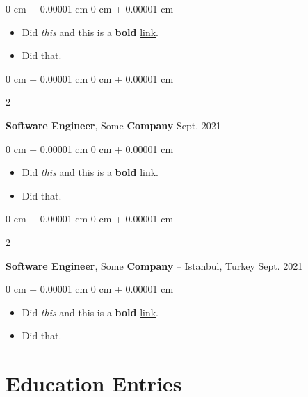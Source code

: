 \documentclass[10pt, letterpaper]{article}
\newenvironment{highlights}{
    \begin{itemize}[
        topsep=0.10 cm,
        parsep=0.10 cm,
        partopsep=0pt,
        itemsep=0pt,
        leftmargin=0 cm + 10pt
    ]
}{
    \end{itemize}
} %
\newenvironment{onecolentry}{
    \begin{adjustwidth}{
        0 cm + 0.00001 cm
    }{
        0 cm + 0.00001 cm
    }
}{
    \end{adjustwidth}
} %
\newenvironment{twocolentry}[2][]{
    \onecolentry
    \def\secondColumn{#2}
    \setcolumnwidth{\fill, 4.5 cm}
    \begin{paracol}{2}
}{
    \switchcolumn \raggedleft \secondColumn
    \end{paracol}
    \endonecolentry
} %
\begin{document}
        \vspace{0.10 cm}
        \begin{onecolentry}
            \begin{highlights}
                \item Did \textit{this} and this is a \textbf{bold} \href{https://example.com}{link}.
                \item Did that.
            \end{highlights}
        \end{onecolentry}


        \vspace{0.2 cm}

        \begin{twocolentry}{
            Sept. 2021
        }
            \textbf{Software Engineer}, Some \textbf{Company}\end{twocolentry}

        \vspace{0.10 cm}
        \begin{onecolentry}
            \begin{highlights}
                \item Did \textit{this} and this is a \textbf{bold} \href{https://example.com}{link}.
                \item Did that.
            \end{highlights}
        \end{onecolentry}


        \vspace{0.2 cm}

        \begin{twocolentry}{
            Sept. 2021
        }
            \textbf{Software Engineer}, Some \textbf{Company} -- Istanbul, Turkey\end{twocolentry}

        \vspace{0.10 cm}
        \begin{onecolentry}
            \begin{highlights}
                \item Did \textit{this} and this is a \textbf{bold} \href{https://example.com}{link}.
                \item Did that.
            \end{highlights}
        \end{onecolentry}



    
    \section{Education Entries}
\end{document}
